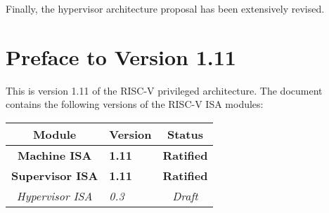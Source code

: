 Finally, the hypervisor architecture proposal has been extensively revised.

\newpage

\section*{Preface to Version 1.11}

This is version 1.11 of the RISC-V privileged architecture.
The document contains the following versions of the RISC-V ISA
modules:

{
\begin{table}[hbt]
  \centering
  \begin{tabular}{|c|l|c|}
    \hline
    Module             & Version  & Status\\
    \hline
    \bf Machine ISA    & \bf 1.11 & \bf Ratified \\
    \bf Supervisor ISA & \bf 1.11 & \bf Ratified \\
    \em Hypervisor ISA & \em 0.3  & \em Draft \\
    \hline
  \end{tabular}
\end{table}
}

